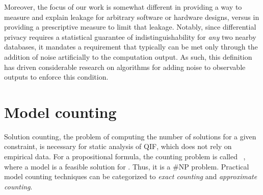 Moreover, the focus of our work is somewhat different in providing a
way to measure and explain leakage for arbitrary software or hardware
designs, versus in providing a prescriptive measure to limit that
leakage.  Notably, since differential privacy requires a statistical
guarantee of indistinguishability for \textit{any} two nearby
databases, it mandates a requirement that typically can be met only
through the addition of noise artificially to the computation output.
As such, this definition has driven considerable research on
algorithms for adding noise to observable outputs to enforce this
condition.


\iffalse
neighboring
databases that differ only in one row.  Specifically, the $\epsilon$
parameterizes the probability difference of outputting similar
observables between all dataset pairs.  To some extent, the $\epsilon$
could be treated as a measure of the "amount" of leakage from an
algorithm.  However, a practical procedure hardly achieves the
differential privacy with a small $\epsilon$.  On the one hand, it
restricts the upper bound when distinguishing all pairs. A procedure
would break the $\epsilon$-differential property, once there is one
datasets pair breaking it. One the other hand, as a measure,
$\epsilon$ is not fair enough for different procedures leaking in
different patterns as it only measures the upper bound for the worst
pair.  In contrast, we simply measure and explain the leakage, versus
providing a prescriptive measure to limit that leakage.   

Furthermore, since the differential privacy is a probabilistic
property, it requires the known distribution and the probabilities of
outputting each observable value condition on each secret (i.e.,
dataset) value.  Thus, measuring the sounded $\epsilon$ used in
differential privacy required more enumerations over all possible
combination of observable and secret values.  
\fi

\section{Model counting}
Solution counting, the problem of computing the number of solutions
for a given constraint, is necessary for static analysis of \gls{QIF},
which does not rely on empirical data. For a propositional formula,
the counting problem is called \sharpSAT ~\cite{gomes2008model}, where
a model is a feasible solution for \satProp.  Thus, it is a \#NP
problem. Practical model counting techniques can be categorized to
\textit{exact counting} and \textit{approximate counting}. 

